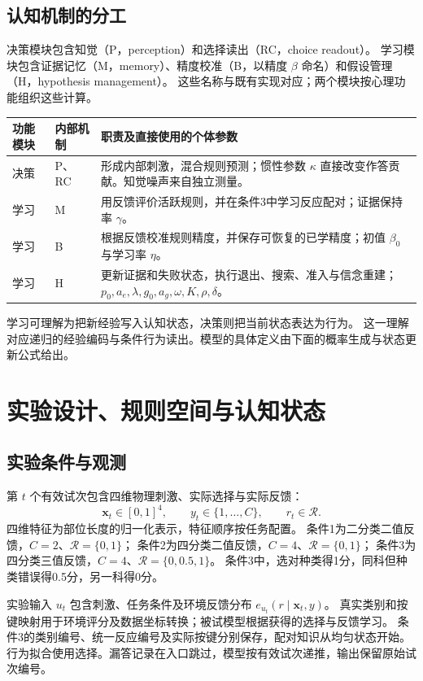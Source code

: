 \documentclass[11pt,a4paper]{article}
\numberwithin{equation}{section}
\newcommand{\Rr}{\mathcal{R}}
\begin{document}
\subsection{认知机制的分工}
决策模块包含知觉（P，perception）和选择读出（RC，choice readout）。
学习模块包含证据记忆（M，memory）、精度校准（B，以精度 $\beta$ 命名）和假设管理（H，hypothesis management）。
这些名称与既有实现对应；两个模块按心理功能组织这些计算。

{\small\noindent
\begin{tabularx}{\linewidth}{L{1.8cm}L{2.0cm}Y}
\toprule
功能模块 & 内部机制 & 职责及直接使用的个体参数\\
\midrule
决策 & P、RC & 形成内部刺激，混合规则预测；惯性参数 $\kappa$ 直接改变作答贡献。知觉噪声来自独立测量。\\
学习 & M & 用反馈评价活跃规则，并在条件3中学习反应配对；证据保持率 $\gamma$。\\
学习 & B & 根据反馈校准规则精度，并保存可恢复的已学精度；初值 $\beta_0$ 与学习率 $\eta$。\\
学习 & H & 更新证据和失败状态，执行退出、搜索、准入与信念重建；$p_0,a_e,\lambda,g_0,a_g,\omega,K,\rho,\delta$。\\
\bottomrule
\end{tabularx}}

学习可理解为把新经验写入认知状态，决策则把当前状态表达为行为。
这一理解对应递归的经验编码与条件行为读出。模型的具体定义由下面的概率生成与状态更新公式给出。

\section{实验设计、规则空间与认知状态}
\label{sec:state}

\subsection{实验条件与观测}
第 $t$ 个有效试次包含四维物理刺激、实际选择与实际反馈：
\begin{equation}
\bm x_t\in[0,1]^4,\qquad y_t\in\{1,\ldots,C\},\qquad r_t\in\Rr.
\end{equation}
四维特征为部位长度的归一化表示，特征顺序按任务配置。
条件1为二分类二值反馈，$C=2$、$\Rr=\{0,1\}$；
条件2为四分类二值反馈，$C=4$、$\Rr=\{0,1\}$；
条件3为四分类三值反馈，$C=4$、$\Rr=\{0,0.5,1\}$。
条件3中，选对种类得1分，同科但种类错误得0.5分，另一科得0分。

实验输入 $u_t$ 包含刺激、任务条件及环境反馈分布 $e_{u_t}(r\mid\bm x_t,y)$。
真实类别和按键映射用于环境评分及数据坐标转换；被试模型根据获得的选择与反馈学习。
条件3的类别编号、统一反应编号及实际按键分别保存，配对知识从均匀状态开始。
行为拟合使用选择。漏答记录在入口跳过，模型按有效试次递推，输出保留原始试次编号。
\end{document}

